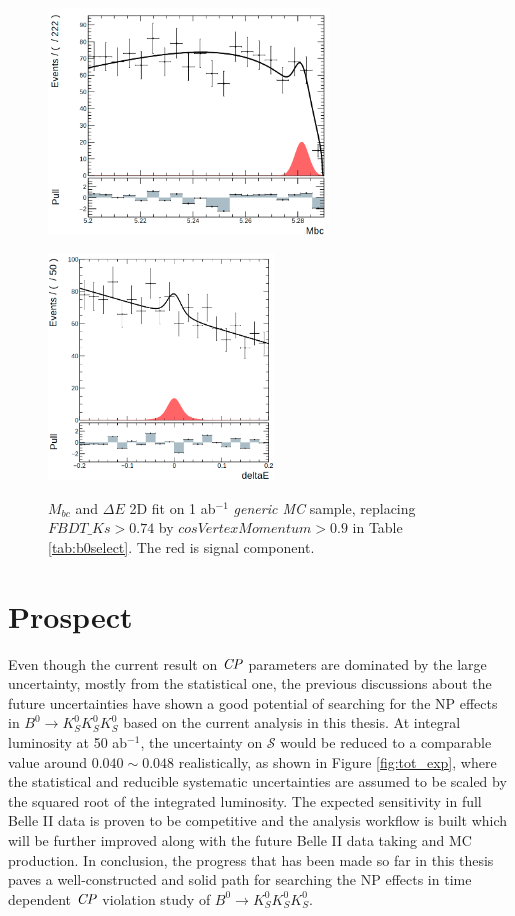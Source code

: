 \begin{figure}[htbp]
	\begin{minipage}[b]{0.5\linewidth}
		\centering 
		\includegraphics[height=6cm]{figures/mbcfit_noksdata.png}
		\label{}
	\end{minipage}
	\begin{minipage}[b]{0.5\linewidth}
		\centering 
		\includegraphics[height=6cm]{figures/dEfit_noksdata.png}
		\label{}
	\end{minipage}
	\caption{$M_{bc}$ and $\Delta E$ 2D fit on 1 ab$^{-1}$ \textit{generic MC} sample, replacing $FBDT\_Ks>0.74$ by ${cosVertexMomentum}>0.9$ in Table \ref{tab:b0select}. The red is signal component.}
	\label{fig:2Ddata_noks}
\end{figure}


\section{Prospect}
Even though the current result on $\it{CP}$ parameters are dominated by the large uncertainty, mostly from the statistical one, the previous discussions about the future uncertainties have shown a good potential of searching for the NP effects in $B^0 \to K_S^0  K_S^0  K_S^0$ based on the current analysis in this thesis. At integral luminosity at 50 ab$^{-1}$, the uncertainty on $\mathcal{S}$ would be reduced to a comparable value around $0.040\sim0.048$ realistically, as shown in Figure \ref{fig:tot_exp}, where the statistical and reducible systematic uncertainties are assumed to be scaled by the squared root of the integrated luminosity. The expected sensitivity in full Belle II data is proven to be competitive and the analysis workflow is built which will be further improved along with the future Belle II data taking and MC production. In conclusion, the progress that has been made so far in this thesis paves a well-constructed and solid path for searching the NP effects in time dependent $\it{CP}$ violation study of $B^0 \to K_S^0  K_S^0  K_S^0$. 
 
